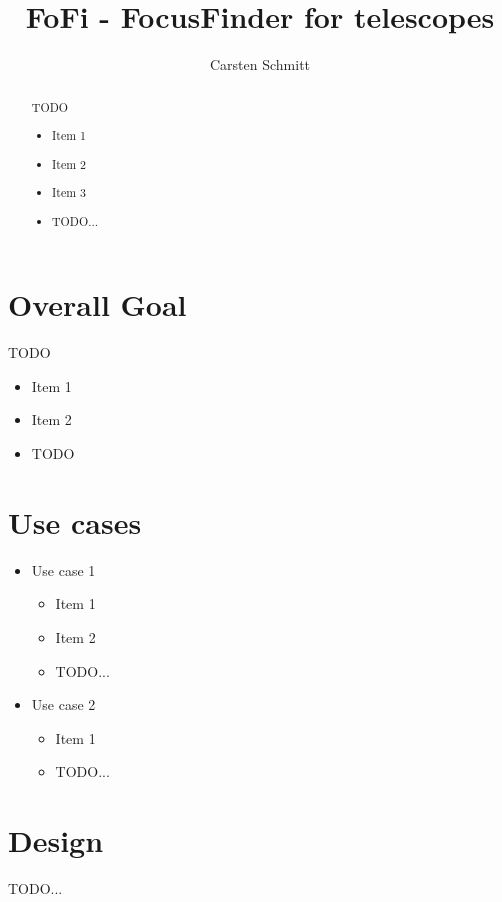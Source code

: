 \documentclass{article}
\author{Carsten Schmitt}
\begin{document}
\title{FoFi - FocusFinder for telescopes}

\maketitle

\begin{abstract}
\noindent
TODO

\begin{itemize}
  \item Item 1
  \item Item 2
  \item Item 3
  \item TODO...
\end{itemize}

\end{abstract}

\setcounter{tocdepth}{2}
\tableofcontents

\newpage

\section{Overall Goal}
TODO

\begin{itemize}
\item Item 1
\item Item 2
\item TODO
\end{itemize}



\section{Use cases}

\begin{itemize}
\item Use case 1
  \begin{itemize}
  \item Item 1
  \item Item 2
  \item TODO...
  \end{itemize}

    
\item Use case 2
  \begin{itemize}
  \item Item 1
  \item TODO...
  \end{itemize}
  
\end{itemize}


\section{Design}
TODO...
\end{document}
